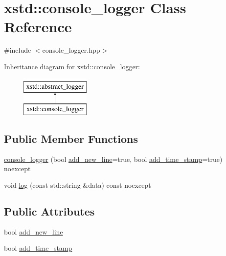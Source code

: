 \hypertarget{classxstd_1_1console__logger}{\section{xstd\-:\-:console\-\_\-logger Class Reference}
\label{classxstd_1_1console__logger}
}


{\ttfamily \#include $<$console\-\_\-logger.\-hpp$>$}

Inheritance diagram for xstd\-:\-:console\-\_\-logger\-:\begin{figure}[H]
\begin{center}
\leavevmode
\includegraphics[height=2.000000cm]{classxstd_1_1console__logger}
\end{center}
\end{figure}
\subsection*{Public Member Functions}
\begin{DoxyCompactItemize}
\item 
\hyperlink{classxstd_1_1console__logger_a81ece8d9559e0ff0d54ad8d6cca596bc}{console\-\_\-logger} (bool \hyperlink{classxstd_1_1abstract__logger_a5216ec0a18fea2571db19d5a55d8700f}{add\-\_\-new\-\_\-line}=true, bool \hyperlink{classxstd_1_1abstract__logger_a534b4f6a3dcdd3b7f18abfcb1bb5b937}{add\-\_\-time\-\_\-stamp}=true) noexcept
\item 
void \hyperlink{classxstd_1_1abstract__logger_ad470970ac4726355f3423017f434ace8}{log} (const std\-::string \&data) const noexcept
\end{DoxyCompactItemize}
\subsection*{Public Attributes}
\begin{DoxyCompactItemize}
\item 
bool \hyperlink{classxstd_1_1abstract__logger_a5216ec0a18fea2571db19d5a55d8700f}{add\-\_\-new\-\_\-line}
\item 
bool \hyperlink{classxstd_1_1abstract__logger_a534b4f6a3dcdd3b7f18abfcb1bb5b937}{add\-\_\-time\-\_\-stamp}
\end{DoxyCompactItemize}
